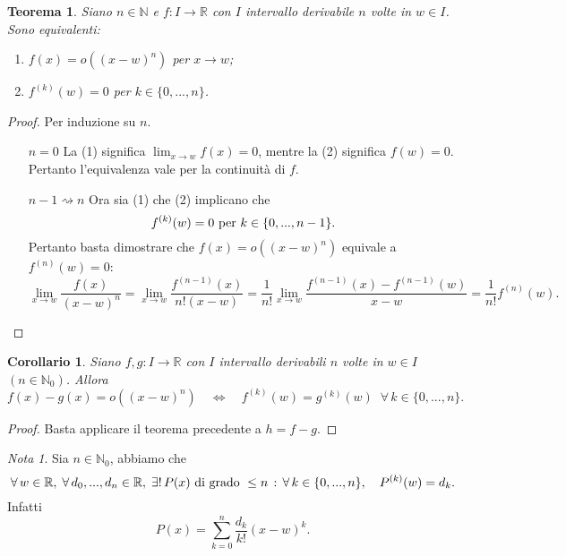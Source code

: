 \documentclass{article}
\theoremstyle{plain}
\newtheorem{thm}{Teorema}[section]
\newtheorem{cor}{Corollario}
\theoremstyle{definition}
\theoremstyle{remark}
\newtheorem{note}{Nota}
\begin{document}
\begin{bxthm}
\begin{thm}
    Siano $n\in\mathbb{N}$ e $f:I\to\mathbb{R}$ con $I$ intervallo derivabile $n$ volte in $w\in I$. Sono equivalenti:
    \begin{enumerate}
        \item $f(x)=o((x-w)^n)$ per $x\to w$;
        \item $f^{(k)}(w)=0$ per $k\in \{0,...,n\}$.
    \end{enumerate}
\end{thm}
\end{bxthm}
\begin{proof}
    Per induzione su $n$. 
    \begin{itemize}
        \item[$n=0$]
        La (1) significa $\lim_{x\to w}f(x)=0$, mentre la (2) significa $f(w)=0$.
        Pertanto l'equivalenza vale per la continuità di $f$. 
        \item[$n-1\rightsquigarrow n$]
        Ora sia (1) che (2) implicano che 
        \[f^{(k)}(w)=0\textup{ per }k\in \{0,...,n-1\}.\]
        Pertanto basta dimostrare che $f(x)=o((x-w)^n)$ equivale a $f^{(n)}(w)=0$:
        \[\lim_{x\to w}\dfrac{f(x)}{(x-w)^n}=\lim_{x\to w}\dfrac{f^{(n-1)}(x)}{n!(x-w)}=\dfrac{1}{n!}\lim_{x\to w}\dfrac{f^{(n-1)}(x)-f^{(n-1)}(w)}{x-w}=\dfrac{1}{n!}f^{(n)}(w).\]
    \end{itemize}
\end{proof}

\vspace{10pt}

\begin{bxthm}
\begin{cor}
    Siano $f,g:I\to\mathbb{R}$ con $I$ intervallo derivabili $n$ volte in $w\in I$ $(n\in\mathbb{N}_0)$.
    Allora 
    \[f(x)-g(x)=o((x-w)^n)\quad\iff\quad f^{(k)}(w)=g^{(k)}(w)\;\;\forall\,k\in\{0,...,n\}.\]
\end{cor}
\end{bxthm}
\begin{proof}
    Basta applicare il teorema precedente a $h=f-g$.
\end{proof}

\vspace{10pt}

\begin{note}
    Sia $n\in \mathbb{N}_0$, abbiamo che 
    \[\forall\,w\in\mathbb{R},\;\forall\, d_0,...,d_n\in\mathbb{R},\;\exists!\,P(x)\textup{ di grado }\leq n\,:\,\forall\,k\in\{0,...,n\},\quad P^{(k)}(w)=d_k.\]
    Infatti \[P(x)=\sum_{k=0}^{n}\dfrac{d_k}{k!}(x-w)^k.\]
\end{note}
\end{document}
